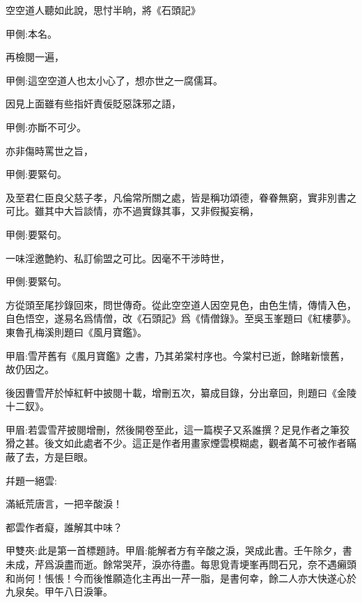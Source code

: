 \begin{parag}
    空空道人聽如此說，思忖半晌，將《石頭記》\begin{note}甲側:本名。\end{note}再檢閱一遍，\begin{note}甲側:這空空道人也太小心了，想亦世之一腐儒耳。\end{note}因見上面雖有些指奸責佞貶惡誅邪之語，\begin{note}甲側:亦斷不可少。\end{note}亦非傷時罵世之旨，\begin{note}甲側:要緊句。\end{note}及至君仁臣良父慈子孝，凡倫常所關之處，皆是稱功頌德，眷眷無窮，實非別書之可比。雖其中大旨談情，亦不過實錄其事，又非假擬妄稱，\begin{note}甲側:要緊句。\end{note}一味淫邀艶約、私訂偷盟之可比。因毫不干涉時世，\begin{note}甲側:要緊句。\end{note}方從頭至尾抄錄回來，問世傳奇。從此空空道人因空見色，由色生情，傳情入色，自色悟空，遂易名爲情僧，改《石頭記》爲《情僧錄》。至吳玉峯題曰《紅樓夢》。東魯孔梅溪則題曰《風月寶鑑》。\begin{note}甲眉:雪芹舊有《風月寶鑑》之書，乃其弟棠村序也。今棠村已逝，餘睹新懷舊，故仍因之。\end{note}後因曹雪芹於悼紅軒中披閱十載，增刪五次，纂成目錄，分出章回，則題曰《金陵十二釵》。\begin{note}甲眉:若雲雪芹披閱增刪，然後開卷至此，這一篇楔子又系誰撰？足見作者之筆狡猾之甚。後文如此處者不少。這正是作者用畫家煙雲模糊處，觀者萬不可被作者瞞蔽了去，方是巨眼。\end{note}幷題一絕雲:
\end{parag}


\begin{poem}
    \begin{pl}滿紙荒唐言，一把辛酸淚！\end{pl}

    \begin{pl}都雲作者癡，誰解其中味？\end{pl}
    \begin{note}甲雙夾:此是第一首標題詩。甲眉:能解者方有辛酸之淚，哭成此書。壬午除夕，書未成，芹爲淚盡而逝。餘常哭芹，淚亦待盡。每思覓青埂峯再問石兄，奈不遇癩頭和尚何！悵悵！今而後惟願造化主再出一芹一脂，是書何幸，餘二人亦大快遂心於九泉矣。甲午八日淚筆。\end{note}
\end{poem}


